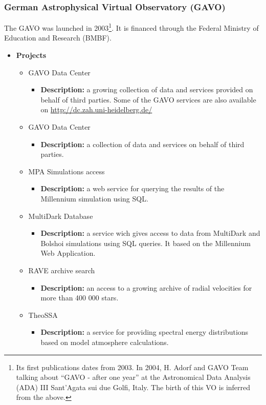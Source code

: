 \subsubsection{German Astrophysical Virtual Observatory (GAVO)}
The GAVO was launched in 2003\footnote{Its first publications dates from 2003.
In 2004, H. Adorf and GAVO Team talking about ``GAVO - after one year'' at the
Astronomical Data Analysis (ADA) III Sant'Agata sui due Golfi, Italy. The birth
of this VO is inferred from the above.}. It is financed through the Federal
Ministry of Education and Research (BMBF).

\begin{itemize}
\item \textbf{Projects}
\begin{itemize}
\item GAVO Data Center
\begin{itemize}
\item \textbf{Description:} a growing collection of data and services provided
on behalf of third parties. Some of the GAVO services are also available on
\url{http://dc.zah.uni-heidelberg.de/}
\end{itemize}
\item GAVO Data Center
\begin{itemize}
\item \textbf{Description:} a collection of data and services on behalf of third
parties.
\end{itemize}
\item MPA Simulations access
\begin{itemize}
\item \textbf{Description:} a web service for querying the results of the
Millennium simulation using SQL.
\end{itemize}
\item MultiDark Database
\begin{itemize}
\item \textbf{Description:} a service wich gives access to data from MultiDark
and Bolshoi simulations using SQL queries.  It based on the Millennium Web
Application.
\end{itemize}
\item RAVE archive search
\begin{itemize}
\item \textbf{Description:} an access to a growing archive of radial velocities
for more than 400 000 stars.
\end{itemize}
\item TheoSSA
\begin{itemize}
\item \textbf{Description:} a service for providing spectral energy
distributions based on model atmosphere calculations.
\end{itemize}
\end{itemize}
\end{itemize}

